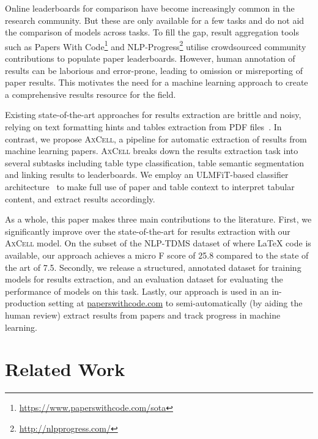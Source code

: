\documentclass[11pt,a4paper]{article}
\newcommand{\model}{\textsc{AxCell}}
\begin{document}
Online leaderboards for comparison have become increasingly common in the research community. But these are only available for a few tasks and do not aid the comparison of models across tasks. To fill the gap, result aggregation tools such as Papers With Code\footnote{\url{https://www.paperswithcode.com/sota}} and NLP-Progress\footnote{\url{http://nlpprogress.com/}} utilise crowdsourced community contributions to populate paper leaderboards. However, human annotation of results can be laborious and error-prone, leading to omission or misreporting of paper results. This motivates the need for a machine learning approach to create a comprehensive results resource for the field.

Existing state-of-the-art approaches for results extraction are brittle and noisy, relying on text formatting hints and tables extraction from PDF files~\citep{ibm-extraction}. In contrast, we propose \model{}, a pipeline for automatic extraction of results from machine learning papers. \model{} breaks down the results extraction task into several subtasks including table type classification, table semantic segmentation and linking results to leaderboards. We employ an ULMFiT-based classifier architecture~\citep{ulmfit} to make full use of paper and table context to interpret tabular content, and extract results accordingly. 

As a whole, this paper makes three main contributions to the literature. First, we significantly improve over the state-of-the-art for results extraction with our \model{} model. On the subset of the NLP-TDMS dataset of \citet{ibm-extraction} where \LaTeX{} code is available, our approach achieves a micro F score of 25.8 compared to the state of the art of 7.5. Secondly, we release a structured, annotated dataset for training models for results extraction, and an evaluation dataset for evaluating the performance of models on this task. Lastly, our approach is used in an in-production setting at \href{https://paperswithcode.com}{paperswithcode.com} to semi-automatically (by aiding the human review) extract results from papers and track progress in machine learning. 

\section{Related Work}
\end{document}
